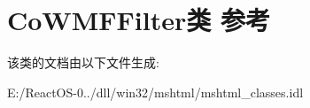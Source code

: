 \hypertarget{class_co_w_m_f_filter}{}\section{Co\+W\+M\+F\+Filter类 参考}
\label{class_co_w_m_f_filter}


该类的文档由以下文件生成\+:\begin{DoxyCompactItemize}
\item 
E\+:/\+React\+O\+S-\/0../dll/win32/mshtml/mshtml\+\_\+classes.\+idl\end{DoxyCompactItemize}
